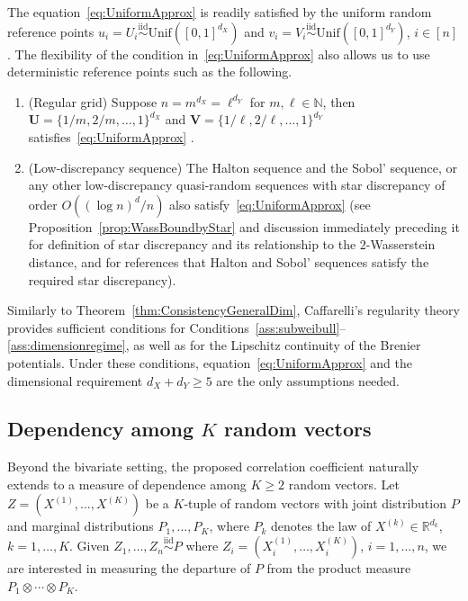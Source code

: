 \documentclass[11pt]{article}
\newcommand{\bs}[1]{\boldsymbol{#1}}
\begin{document}
The equation~\eqref{eq:UniformApprox} is readily satisfied by the uniform random reference points $u_i = U_i \stackrel{\mathrm{iid}}{\sim}\mathrm{Unif}([0, 1]^{d_X})$ and $v_i = V_i \stackrel{\mathrm{iid}}{\sim}\mathrm{Unif}([0, 1]^{d_Y})$, $i\in[n]$ \citep{fournier2015rate}. The flexibility of the condition in~\eqref{eq:UniformApprox} also allows us to use deterministic reference points such as the following.
\begin{enumerate}[label = \roman*.]
    \item{(Regular grid)} Suppose $n = m^{d_X} = \ell^{d_Y}$ for $m,\ell\in\mathbb{N}$, then ${\bs U} = \{1/m, 2/m, \ldots, 1\}^{d_X}$ and ${\bs V} =  \{1/\ell, 2/\ell, \ldots, 1\}^{d_Y}$ satisfies~\eqref{eq:UniformApprox} \citep[see e.g.,][Example 4.17]{graf2000foundations}. 
    \item{(Low-discrepancy sequence)} The Halton sequence and the Sobol' sequence, or any other low-discrepancy quasi-random sequences with star discrepancy of order $O((\log n)^d / n)$  also satisfy~\eqref{eq:UniformApprox} (see Proposition~\ref{prop:WassBoundbyStar} and discussion immediately preceding it for definition of star discrepancy and its relationship to the $2$-Wasserstein distance, and \citet[Theorem~3.6 and 4.17]{niederreiter1992random} for references that Halton and Sobol' sequences satisfy the required star discrepancy).
\end{enumerate}

Similarly to Theorem~\ref{thm:ConsistencyGeneralDim}, Caffarelli's regularity theory provides sufficient conditions for Conditions~\ref{ass:subweibull}--\ref{ass:dimensionregime}, as well as for the Lipschitz continuity of the Brenier potentials. Under these conditions, equation~\eqref{eq:UniformApprox} and the dimensional requirement $d_X + d_Y \geq 5$ are the only assumptions needed.




\subsection{Dependency among $K$ random vectors} \label{sec:DependencyAmongKRV}
Beyond the bivariate setting, the proposed correlation coefficient naturally extends to a measure of dependence among $K \geq 2$ random vectors. Let ${Z}=(X^{(1)},\ldots,X^{(K)})$ be a $K$-tuple of random vectors with joint distribution $P$ and marginal distributions $P_1,\ldots,P_K$, where $P_k$ denotes the law of $X^{(k)}\in \mathbb{R}^{d_k}$, $k = 1, \ldots, K$. Given $Z_1, \ldots, Z_n \stackrel{\mathrm{iid}}{\sim} P$ where ${Z}_i = (X_i^{(1)}, \ldots, X_i^{(K)})$, $i = 1, \ldots, n$, we are interested in measuring the departure of $P$ from the product measure $P_1\otimes\cdots\otimes P_K$.
\end{document}
